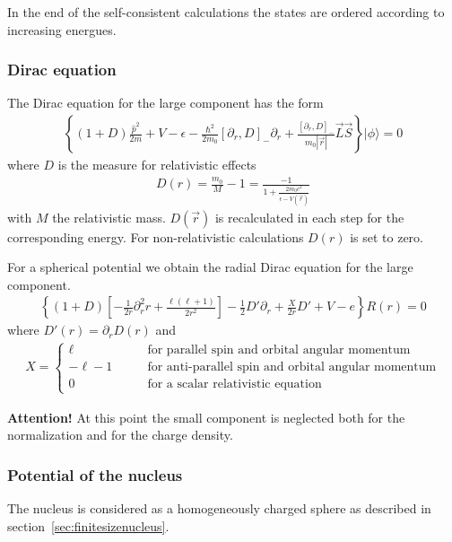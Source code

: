 \documentclass[11pt,a4paper]{report}
\begin{document}
In the end of the self-consistent calculations the states are ordered
according to increasing energues.

\subsubsection{Dirac equation}
The Dirac equation for the large component has the form
\begin{eqnarray*}
\left\lbrace
(1+D)\frac{\hat{p}^2}{2m}+V-\epsilon
-\frac{\hbar^2}{2m_0}[\partial_r,D]_-\partial_r
+\frac{[\partial_r,D]_-}{m_0|\vec{r}|}\vec{L}\vec{S}
\right\rbrace|\phi\rangle=0
\end{eqnarray*}
where $D$ is the measure for relativistic effects
\begin{eqnarray*}
D(r)=\frac{m_0}{M}-1=\frac{-1}{1+\frac{2m_0c^2}{\epsilon-V(\vec{r})}}
\end{eqnarray*}
with $M$ the relativistic mass. $D(\vec{r})$ is recalculated in each
step for the corresponding energy. For non-relativistic calculations
$D(r)$ is set to zero.

For a spherical potential we obtain the radial Dirac equation for the
large component.
\begin{eqnarray*}
\left\lbrace
(1+D)\left[-\frac{1}{2r}\partial_r^2 r+\frac{\ell(\ell+1)}{2r^2}\right]
-\frac{1}{2}D'\partial_r+\frac{X}{2r}D'+V-e\right\rbrace R(r)=0
\end{eqnarray*}
where $D'(r)=\partial_rD(r)$ and
\begin{eqnarray}
X=\left\lbrace\begin{array}{ll}
\ell &\qquad\textrm{for parallel spin and orbital angular momentum}\\
-\ell-1 &\qquad\textrm{for anti-parallel spin and orbital angular momentum}\\
0&\qquad\textrm{for a scalar relativistic equation}
	      \end{array}\right.
\end{eqnarray}

\textbf{Attention!} At this point the small component is neglected
both for the normalization and for the charge density.

\subsubsection{Potential of the nucleus}
The nucleus is considered as a homogeneously charged sphere as
described in section~\ref{sec:finitesizenucleus}.
\end{document}
